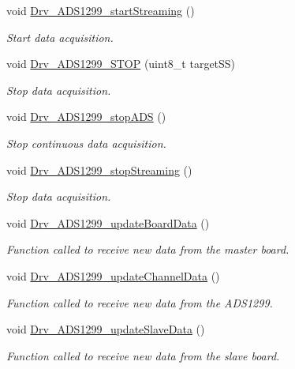 \begin{DoxyCompactItemize}
void \hyperlink{group__ADS1299__Library_gad3ea6087f205bfce6610c763f3f332d3}{Drv\+\_\+\+A\+D\+S1299\+\_\+start\+Streaming} ()
\begin{DoxyCompactList}\small\item\em Start data acquisition. \end{DoxyCompactList}\item 
void \hyperlink{group__ADS1299__Library_ga745a56f8f9a82a3ff488fdfa44b5877c}{Drv\+\_\+\+A\+D\+S1299\+\_\+\+S\+T\+OP} (uint8\+\_\+t target\+SS)
\begin{DoxyCompactList}\small\item\em Stop data acquisition. \end{DoxyCompactList}\item 
void \hyperlink{group__ADS1299__Library_gafed9edc40d47ce6fc0c7c5325b616d74}{Drv\+\_\+\+A\+D\+S1299\+\_\+stop\+A\+DS} ()
\begin{DoxyCompactList}\small\item\em Stop continuous data acquisition. \end{DoxyCompactList}\item 
void \hyperlink{group__ADS1299__Library_ga76f9b41b04d6ac6a9fc5ba36884df125}{Drv\+\_\+\+A\+D\+S1299\+\_\+stop\+Streaming} ()
\begin{DoxyCompactList}\small\item\em Stop data acquisition. \end{DoxyCompactList}\item 
void \hyperlink{group__ADS1299__Library_ga6a7fda986df83568223e0d81ec493169}{Drv\+\_\+\+A\+D\+S1299\+\_\+update\+Board\+Data} ()
\begin{DoxyCompactList}\small\item\em Function called to receive new data from the master board. \end{DoxyCompactList}\item 
void \hyperlink{group__ADS1299__Library_gab649fc7f231ca292b9c06cc31e50fff1}{Drv\+\_\+\+A\+D\+S1299\+\_\+update\+Channel\+Data} ()
\begin{DoxyCompactList}\small\item\em Function called to receive new data from the A\+D\+S1299. \end{DoxyCompactList}\item 
void \hyperlink{group__ADS1299__Library_gaf7e73c7a2a885b3ce8c63cc1af03851c}{Drv\+\_\+\+A\+D\+S1299\+\_\+update\+Slave\+Data} ()
\begin{DoxyCompactList}\small\item\em Function called to receive new data from the slave board. \end{DoxyCompactList}\item 

\end{DoxyCompactItemize}
